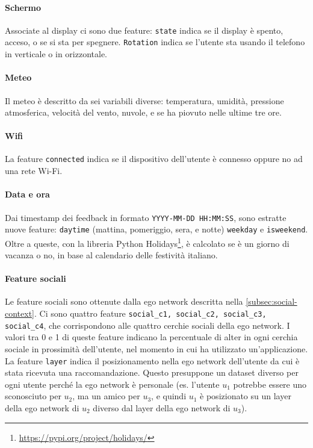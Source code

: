 \documentclass[12pt,italian]{report}
\begin{document}
\paragraph{Schermo} Associate al display ci sono due feature: \texttt{state} indica se il display è spento, acceso, o se si sta per spegnere. \texttt{Rotation} indica se l'utente sta usando il telefono in verticale o in orizzontale.

\paragraph{Meteo} Il meteo è descritto da sei variabili diverse: temperatura, umidità, pressione atmosferica, velocità del vento, nuvole, e se ha piovuto nelle ultime tre ore.

\paragraph{Wifi} La feature \texttt{connected} indica se il dispositivo dell'utente è connesso oppure no ad una rete Wi-Fi.

\paragraph{Data e ora} Dai timestamp dei feedback in formato \texttt{YYYY-MM-DD HH:MM:SS}, sono estratte nuove feature: \texttt{daytime} (mattina, pomeriggio, sera, e notte) \texttt{weekday} e \texttt{isweekend}. Oltre a queste, con la libreria Python Holidays\footnote{\url{https://pypi.org/project/holidays/}}, è calcolato se è un giorno di vacanza o no, in base al calendario delle festività italiano.

\paragraph{Feature sociali} Le feature sociali sono ottenute dalla ego network descritta nella \autoref{subsec:social-context}. Ci sono quattro feature \texttt{social\_c1, social\_c2, social\_c3, social\_c4}, che corrispondono alle quattro cerchie sociali della ego network. I valori tra 0 e 1 di queste feature indicano la percentuale di alter in ogni cerchia sociale in prossimità dell'utente, nel momento in cui ha utilizzato un'applicazione. La feature \texttt{layer} indica il posizionamento nella ego network dell'utente da cui è stata ricevuta una raccomandazione. Questo presuppone un dataset diverso per ogni utente perché la ego network è personale (es. l'utente $u_1$ potrebbe essere uno sconosciuto per $u_2$, ma un amico per $u_3$, e quindi $u_1$ è posizionato su un layer della ego network di $u_2$ diverso dal layer della ego network di $u_3$).
\end{document}
